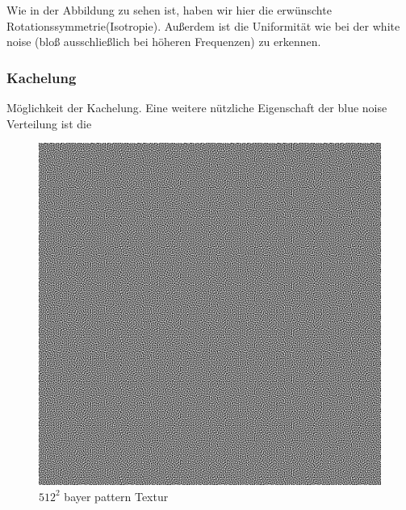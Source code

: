 Wie in der Abbildung zu sehen ist, haben wir hier die erwünschte
Rotationssymmetrie(Isotropie). Außerdem ist die Uniformität wie 
bei der white noise (bloß ausschließlich bei höheren Frequenzen)
zu erkennen. 

\subsubsection{Kachelung}
Möglichkeit der Kachelung. 
Eine weitere nützliche Eigenschaft der blue noise Verteilung ist die 
\begin{figure}[H]\label{pic:tiledBlueNoiseFFT}
    \centering
    \begin{minipage}[t]{0.45\linewidth}
        \centering
        \includegraphics[width=\linewidth]{content/BlueNoise/Bilder/BlueNoise64Tiled.png}
        \caption{$512^{2}$ bayer pattern Textur}
    \end{minipage}
    \hfill
    \begin{minipage}[t]{0.45\linewidth}
        \centering

\end{minipage}
\end{figure}
